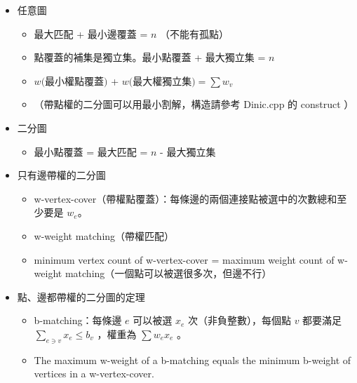 \begin{itemize}
    \item 任意圖
        \begin{itemize}
            \item 最大匹配 + 最小邊覆蓋 = $n$ （不能有孤點）
            \item  點覆蓋的補集是獨立集。最小點覆蓋 + 最大獨立集 = $n$ 
            \item  $w($最小權點覆蓋$)$ + $w($最大權獨立集$) = \sum{w_v}$
            \item  （帶點權的二分圖可以用最小割解，構造請參考 Dinic.cpp 的 construct ）
        \end{itemize}
    \item 二分圖
        \begin{itemize}
            \item 最小點覆蓋 = 最大匹配 = $n$ - 最大獨立集
        \end{itemize}
    \item 只有邊帶權的二分圖
        \begin{itemize}
            \item w-vertex-cover（帶權點覆蓋）：每條邊的兩個連接點被選中的次數總和至少要是 $w_e$。
            \item w-weight matching（帶權匹配） 
            \item minimum vertex count of w-vertex-cover = maximum weight count of w-weight matching（一個點可以被選很多次，但邊不行）
        \end{itemize}
    \item 點、邊都帶權的二分圖的定理
        \begin{itemize}
            \item b-matching：每條邊 $e$ 可以被選 $x_e$ 次（非負整數），每個點 $v$ 都要滿足 $\sum_{e \ni v}{x_e}\leq b_v$ ，權重為 $\sum{w_e x_e}$ 。
            \item The maximum w-weight of a b-matching equals the minimum b-weight of vertices in a w-vertex-cover.
        \end{itemize}
\end{itemize}
